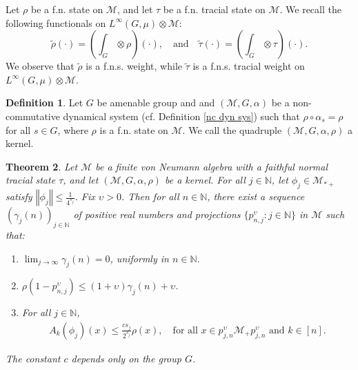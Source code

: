 \documentclass[11pt]{amsart}
\newtheorem{thm}{Theorem}[section]
\theoremstyle{definition}
\newtheorem{defn}[thm]{Definition}
\theoremstyle{myremark}
\numberwithin{equation}{section}
\def\N{\mathbb N}
\newcommand{\CM}{\mathcal{M}}
\newcommand{\ups}{\upsilon}
\newcommand{\norm}[1]{\left\Vert#1\right\Vert}
\begin{document}
Let $\rho$ be a f.n. state on $\CM$, and let $\tau$ be a f.n. tracial state on $\CM$. We recall the following functionals on $L^\infty(G, \mu) \otimes \CM$:
\[
\tilde{\rho}( \cdot ) = \left(\int_{ G} \otimes \rho \right)(\cdot), 
\quad \text{and} \quad 
\tilde{\tau}( \cdot ) = \left(\int_{ G} \otimes \tau \right)(\cdot).
\]
We observe that $\tilde{\rho}$ is a 
f.n.s.  weight, while $\tilde{\tau}$ is a f.n.s. tracial weight on $L^\infty(G, \mu) \otimes \CM$.

\begin{defn}\label{kernel defn}
Let $G$ be amenable group and 	 and $(\CM, G, \alpha)$ be a non-commutative dynamical system (cf. Definition \ref{nc dyn sys}) such that $\rho \circ \alpha_s = \rho$ for all $s \in G$, where $\rho$ is a f.n. state on $\CM$. We call the quadruple $(\CM, G, \alpha, \rho)$ a kernel. 
\end{defn}
\begin{thm}\label{maximal ineq for averages}
	Let $\CM$ be a finite von Neumann algebra with a faithful normal tracial state $\tau$, and let $(\CM, G, \alpha, \rho)$ be a kernel. For all $j \in \N$, let $\phi_j \in \CM_{*+}$ satisfy $\norm{\phi_j} \leq \frac{1}{4^{s_j}}$. Fix $\ups > 0$. Then for all $n \in \N$, there exist a sequence $\left(\gamma_j(n)\right)_{j \in \N}$ of positive real numbers and projections $\{p^{\ups}_{n,j} : j \in \N\}$ in $\CM$ such that:
	\begin{enumerate}\setlength\itemsep{.7em} 
		\item $ \displaystyle \lim_{j \to \infty} \gamma_j(n) = 0$, uniformly in $n \in \N$.  
		\item $\rho(1 - p^{ \ups}_{n,j}) \leq (1 + \ups)\gamma_j(n) + \ups$.  
		\item For all $j \in \N$,
		\begin{align*}
		    A_k(\phi_j)(x) \leq  \frac{c s_j}{2^{s_j}} \rho(x), \quad \text{for all } x \in p^{ \ups}_{j, n} \CM_+ p^{\ups}_{j, n} \text{ and } k \in [n].
\end{align*}
	\end{enumerate}
	The constant $c$ depends only on the group $G$.
\end{thm}
\end{document}
